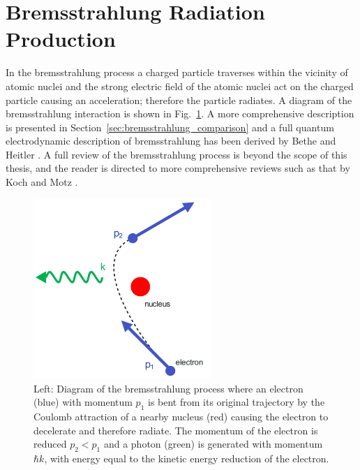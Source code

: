 \documentclass[../main.tex]{subfiles}
\begin{document}
\section{Bremsstrahlung Radiation Production}
\label{sec:bremsstrahlung}

In the bremsstrahlung process a charged particle traverses within the vicinity of atomic nuclei and the strong electric field of the atomic nuclei act on the charged particle causing an acceleration; therefore the particle radiates. A diagram of the bremsstrahlung interaction is shown in Fig.~\ref{fig:brem_intro_diagram}. A more comprehensive description is presented in Section~\ref{sec:bremsstrahlung_comparison} and a full quantum electrodynamic description of bremsstrahlung has been derived by Bethe and Heitler \cite{bethe1934stopping}. A full review of the bremsstrahlung process is beyond the scope of this thesis, and the reader is directed to more comprehensive reviews such as that by Koch and Motz \cite{koch1959bremsstrahlung}. 
\begin{figure}[!h]
\centering
\includegraphics[width=0.6\textwidth]{Figures/Introduction/brem_intro_diagram.pdf}
\caption{Left: Diagram of the bremsstrahlung process where an electron (blue) with momentum $p_{1}$ is bent from its original trajectory by the Coulomb attraction of a nearby nucleus (red) causing the electron to decelerate and therefore radiate. The momentum of the electron is reduced $p_{2} < p_{1}$ and a photon (green) is generated with momentum $\hbar k$, with energy equal to the kinetic energy reduction of the electron.}
\label{fig:brem_intro_diagram}
\end{figure}
\end{document}
